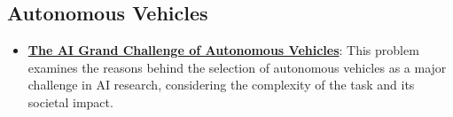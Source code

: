 \documentclass{article}%
\begin{document}
%
\subsection{Autonomous Vehicles}%
\label{subsec:AutonomousVehicles}%
\begin{itemize}[leftmargin=*]%
\item \href{https://purdue.brightspace.com/d2l/common/assets/pdfjs-d2l-dist/1.0.14-legacy/web/viewer.html?file=\%2Fcontent\%2Fenforced\%2F1095467-wl.202510.CS.24300.001\%2F02L2-Intro.pdf\%3Fou\%3D1095467\&lang=en-us\&container=d2l-fileviewer-rendered-pdf\&fullscreen=d2l-fileviewer-rendered-pdf-dialog\&height=667#page=43}{\textbf{The AI Grand Challenge of Autonomous Vehicles}}: This problem examines the reasons behind the selection of autonomous vehicles as a major challenge in AI research, considering the complexity of the task and its societal impact.%
\end{itemize}

%
\end{document}
